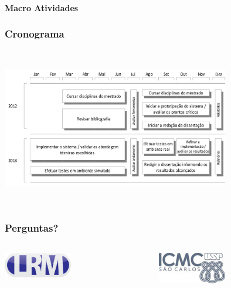 \documentclass[brazil]{beamer}
\begin{document}
\framesubtitle{Macro Atividades}
\begin{frame}
\frametitle{Cronograma}
\includegraphics[width=10cm,height=7cm,]{../img/chrono.png}
\end{frame}


\begin{frame}
\frametitle{Perguntas?}
\centering
\begin{columns}[t]
\begin{column}{4cm}
\includegraphics[width=3cm,keepaspectratio]{../img/logo.png}
\end{column}
\begin{column}{4cm}
\includegraphics[width=3cm,keepaspectratio]{../img/icmc.png}
\end{column}
\end{columns}
\end{frame}
\end{document}

